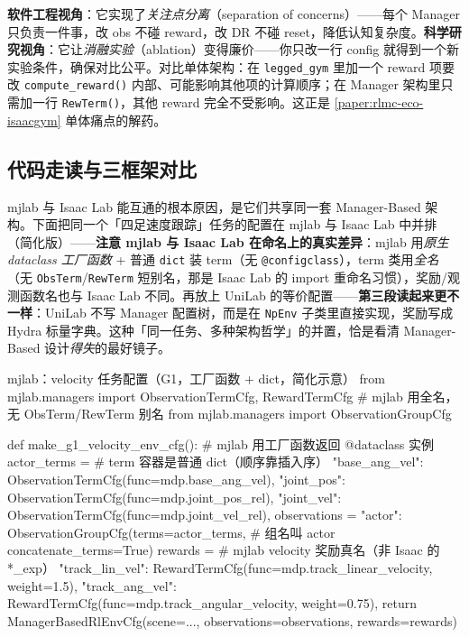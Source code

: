 \begin{insight}\label{ins:rlmc-eco-manager-value}
\textbf{软件工程视角}：它实现了\emph{关注点分离}（separation of concerns）——每个 Manager 只负责一件事，改 obs 不碰 reward，改 DR 不碰 reset，降低认知复杂度。\textbf{科学研究视角}：它让\emph{消融实验}（ablation）变得廉价——你只改一行 config 就得到一个新实验条件，确保对比公平。对比单体架构：在 \verb|legged_gym| 里加一个 reward 项要改 \verb|compute_reward()| 内部、可能影响其他项的计算顺序；在 Manager 架构里只需加一行 \verb|RewTerm()|，其他 reward 完全不受影响。这正是 \cref{paper:rlmc-eco-isaacgym} 单体痛点的解药。
\end{insight}

\subsection{代码走读与三框架对比}
\label{sec:rlmc-eco-manager-compare}

mjlab 与 Isaac Lab 能互通的根本原因，是它们共享同一套 Manager-Based 架构。下面把同一个「四足速度跟踪」任务的配置在 mjlab 与 Isaac Lab 中并排（简化版）——\textbf{注意 mjlab 与 Isaac Lab 在命名上的真实差异}：mjlab 用\emph{原生 dataclass 工厂函数} + 普通 \verb|dict| 装 term（无 \verb|@configclass|），term 类用\emph{全名}（无 \verb|ObsTerm|/\verb|RewTerm| 短别名，那是 Isaac Lab 的 import 重命名习惯），奖励/观测函数名也与 Isaac Lab 不同。再放上 UniLab 的等价配置——\textbf{第三段读起来更不一样}：UniLab 不写 Manager 配置树，而是在 \verb|NpEnv| 子类里直接实现，奖励写成 Hydra 标量字典。这种「同一任务、多种架构哲学」的并置，恰是看清 Manager-Based 设计\emph{得失}的最好镜子。

\begin{codebox}[Python]{mjlab：velocity 任务配置（G1，工厂函数 + dict，简化示意）}
from mjlab.managers import ObservationTermCfg, RewardTermCfg   # mjlab 用全名，无 ObsTerm/RewTerm 别名
from mjlab.managers import ObservationGroupCfg

def make_g1_velocity_env_cfg():                # mjlab 用工厂函数返回 @dataclass 实例
    actor_terms = {                            # term 容器是普通 dict（顺序靠插入序）
        "base_ang_vel": ObservationTermCfg(func=mdp.base_ang_vel),
        "joint_pos":    ObservationTermCfg(func=mdp.joint_pos_rel),
        "joint_vel":    ObservationTermCfg(func=mdp.joint_vel_rel),
    }
    observations = {"actor": ObservationGroupCfg(terms=actor_terms,   # 组名叫 actor
                                                 concatenate_terms=True)}
    rewards = {                                # mjlab velocity 奖励真名（非 Isaac 的 *_exp）
        "track_lin_vel": RewardTermCfg(func=mdp.track_linear_velocity,  weight=1.5),
        "track_ang_vel": RewardTermCfg(func=mdp.track_angular_velocity, weight=0.75),
    }
    return ManagerBasedRlEnvCfg(scene=..., observations=observations, rewards=rewards)
\end{codebox}

